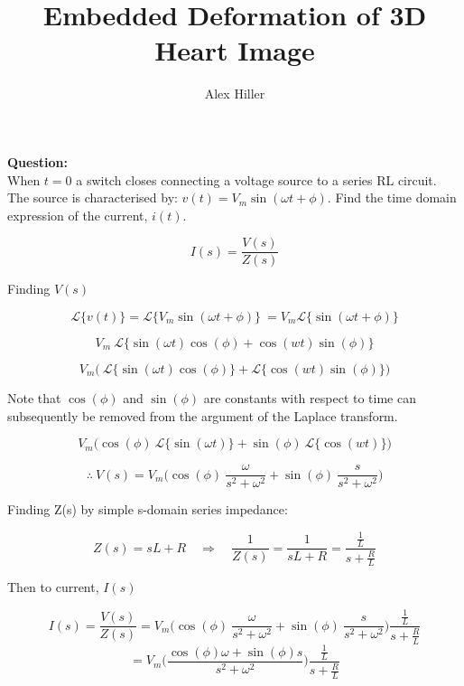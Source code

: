 \documentclass{article}
\author{Alex Hiller}
\title{Embedded Deformation of 3D Heart Image}
\newcommand{\Lapl}[1]{\mathcal{L}  \bigg\{ #1  \bigg\}  }
\begin{document}
\textbf{Question:} \\
When $t=0$ a switch closes connecting a voltage source to a series RL circuit. The source is characterised by: $v(t) = V_m \sin(\omega t + \phi)$. Find the time domain expression of the current, $i(t)$.

\begin{equation}
  I(s) = \frac{V(s)}{Z(s)}
\end{equation}

Finding $V(s)$ 

\begin{equation}
  \Lapl{v(t)} =
  \Lapl{ V_m \sin(\omega t + \phi) } \ =
  V_m \Lapl{ \sin(\omega t + \phi) } 
\end{equation}

\begin{equation}
  V_m \ \Lapl{\sin(\omega t)\cos(\phi) +
  \cos(wt)\sin(\phi)}
\end{equation}

\begin{equation}
  V_m  \bigg( \ \Lapl{\sin(\omega t)\cos(\phi)} +
  \Lapl{\cos(wt)\sin(\phi)} \bigg)
\end{equation}

Note that $\cos(\phi)$ and $\sin(\phi)$ are constants with respect to time can subsequently be removed from the argument of the Laplace transform.

\begin{equation}
   V_m  \bigg( \cos(\phi) \ \Lapl{\sin(\omega t)} +
   \sin(\phi) \ \Lapl{\cos(wt)} \bigg)
\end{equation}

\begin{equation}
  \therefore \ V(s) = 
  V_m  \bigg( \cos(\phi) \ \frac{\omega}{s^2 +
  \omega^2}  +
  \sin(\phi) \ \frac{s}{s^2+\omega^2} \bigg)
\end{equation}

Finding Z(s) by simple s-domain series impedance:

\begin{equation}
  Z(s) =
  sL + R \quad \Rightarrow \quad \frac{1}{Z(s)} =
  \frac{1}{sL + R} =
  \frac{\frac{1}{L}}{s+\frac{R}{L}}
\end{equation}

Then to current, $I(s)$ 

\begin{equation}
  I(s) = 
  \frac{V(s)}{Z(s)} =  
  V_m  \bigg( \cos(\phi) \ \frac{\omega}{s^2 + 
  \omega^2}  + \sin(\phi) \ \frac{s}{s^2+\omega^2} \bigg) \frac{\frac{1}{L}}{s+\frac{R}{L}}
\end{equation}
\begin{equation}
   =  V_m  \bigg(  \frac{\cos(\phi) \omega + 
   \sin(\phi)  s}{s^2 + \omega^2} \bigg) \frac{\frac{1}{L}}{s+\frac{R}{L}}
\end{equation}
\end{document}

